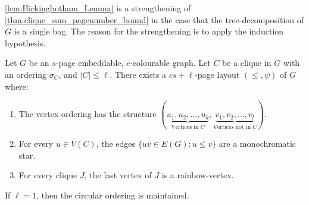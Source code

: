 \cref{lem:Hickingbotham_Lemma} is a strengthening of \cref{thm:clique_sum_pagenumber_bound} in the case that the tree-decomposition of $G$ is a single bag. The reason for the strengthening is to apply the induction hypothesis.
\begin{lemma}\label{lem:Hickingbotham_Lemma}
	Let \(G\) be an $s$-page embeddable, $c$-colourable graph. Let $C$ be a clique in $G$ with an ordering \(\sigma_C\), and $|C| \leq \ell$. There exists a \(cs + \ell\)-page layout \((\leq, \psi)\) of \(G\) where:
	\begin{enumerate}
		\item The vertex ordering has the structure \((\underbrace{u_1, u_2, \ldots, u_k}_{\text{Vertices in } C}, \underbrace{v_1, v_2, \ldots, v_l}_{\text{Vertices not in }C})\).
		\item For every \(u \in V(C)\), the edges \(\lbrace uv \in E(G) : u \leq v \rbrace\) are a monochromatic star.
		\item For every clique \(J\), the last vertex of \(J\) is a rainbow-vertex.
	\end{enumerate}

	If $\ell = 1$, then the circular ordering is maintained. 
\end{lemma}
